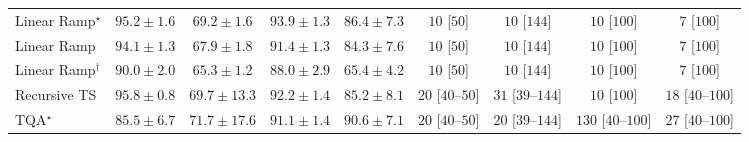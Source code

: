\begin{tabular}{l|cccc|cccc|}
Linear Ramp$^\star$ & {\cellcolor[HTML]{712806}} \color[HTML]{F1F1F1} $95.2\pm 1.6$ & {\cellcolor[HTML]{FEBB47}} \color[HTML]{000000} $69.2\pm 1.6$ & {\cellcolor[HTML]{7C2C05}} \color[HTML]{F1F1F1} $93.9\pm 1.3$ & {\cellcolor[HTML]{C04602}} \color[HTML]{F1F1F1} $86.4\pm 7.3$ & {\cellcolor[HTML]{FFF7F3}} \color[HTML]{000000} $10$ [$50$] & {\cellcolor[HTML]{FFF7F3}} \color[HTML]{000000} $10$ [$144$] & {\cellcolor[HTML]{FFF7F3}} \color[HTML]{000000} $10$ [$100$] & {\cellcolor[HTML]{FFF7F3}} \color[HTML]{000000} $7$ [$100$] \\
Linear Ramp & {\cellcolor[HTML]{7B2B05}} \color[HTML]{F1F1F1} $94.1\pm 1.3$ & {\cellcolor[HTML]{FEC550}} \color[HTML]{000000} $67.9\pm 1.8$ & {\cellcolor[HTML]{933204}} \color[HTML]{F1F1F1} $91.4\pm 1.3$ & {\cellcolor[HTML]{D05104}} \color[HTML]{F1F1F1} $84.3\pm 7.6$ & {\cellcolor[HTML]{FFF7F3}} \color[HTML]{000000} $10$ [$50$] & {\cellcolor[HTML]{FFF7F3}} \color[HTML]{000000} $10$ [$144$] & {\cellcolor[HTML]{FFF7F3}} \color[HTML]{000000} $10$ [$100$] & {\cellcolor[HTML]{FFF7F3}} \color[HTML]{000000} $7$ [$100$] \\
Linear Ramp$^\dagger$ & {\cellcolor[HTML]{A03704}} \color[HTML]{F1F1F1} $90.0\pm 2.0$ & {\cellcolor[HTML]{FED36F}} \color[HTML]{000000} $65.3\pm 1.2$ & {\cellcolor[HTML]{B13F03}} \color[HTML]{F1F1F1} $88.0\pm 2.9$ & {\cellcolor[HTML]{FED26D}} \color[HTML]{000000} $65.4\pm 4.2$ & {\cellcolor[HTML]{FFF7F3}} \color[HTML]{000000} $10$ [$50$] & {\cellcolor[HTML]{FFF7F3}} \color[HTML]{000000} $10$ [$144$] & {\cellcolor[HTML]{FFF7F3}} \color[HTML]{000000} $10$ [$100$] & {\cellcolor[HTML]{FFF7F3}} \color[HTML]{000000} $7$ [$100$] \\
Recursive TS & {\cellcolor[HTML]{6B2606}} \color[HTML]{F1F1F1} $95.8\pm 0.8$ & {\cellcolor[HTML]{FEB744}} \color[HTML]{000000} $69.7\pm 13.3$ & {\cellcolor[HTML]{8C3004}} \color[HTML]{F1F1F1} $92.2\pm 1.4$ & {\cellcolor[HTML]{CB4B02}} \color[HTML]{F1F1F1} $85.2\pm 8.1$ & {\cellcolor[HTML]{FFF4F0}} \color[HTML]{000000} $20$ [$40$--$50$] & {\cellcolor[HTML]{FFF2EE}} \color[HTML]{000000} $31$ [$39$--$144$] & {\cellcolor[HTML]{FFF7F3}} \color[HTML]{000000} $10$ [$100$] & {\cellcolor[HTML]{FFF5F1}} \color[HTML]{000000} $18$ [$40$--$100$] \\
TQA$^\star$ & {\cellcolor[HTML]{C84A02}} \color[HTML]{F1F1F1} $85.5\pm 6.7$ & {\cellcolor[HTML]{FEA937}} \color[HTML]{000000} $71.7\pm 17.6$ & {\cellcolor[HTML]{963304}} \color[HTML]{F1F1F1} $91.1\pm 1.4$ & {\cellcolor[HTML]{9B3504}} \color[HTML]{F1F1F1} $90.6\pm 7.1$ & {\cellcolor[HTML]{FFF4F0}} \color[HTML]{000000} $20$ [$40$--$50$] & {\cellcolor[HTML]{FFF4F0}} \color[HTML]{000000} $20$ [$39$--$144$] & {\cellcolor[HTML]{FDD9D6}} \color[HTML]{000000} $130$ [$40$--$100$] & {\cellcolor[HTML]{FFF3EF}} \color[HTML]{000000} $27$ [$40$--$100$] \\

\end{tabular}
